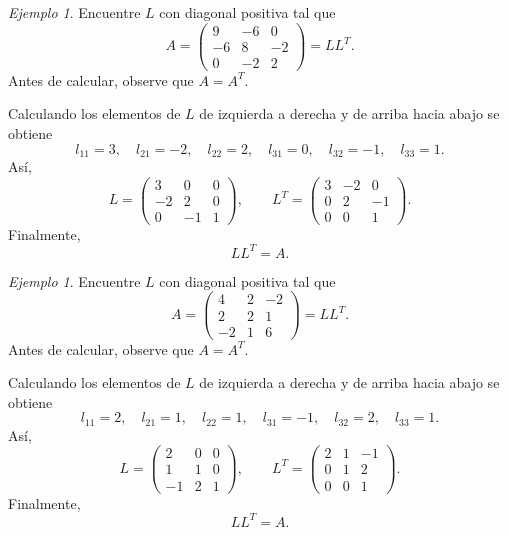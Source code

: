 \documentclass[12pt]{article}
\theoremstyle{remark}
\newtheorem{Ejem}[definicion]{Ejemplo}
\begin{document}
\begin{Ejem}

Encuentre $L$ con diagonal positiva tal que
\[
A=\begin{pmatrix}9 & -6 & 0\\-6 & 8 & -2\\0 & -2 & 2\end{pmatrix}=LL^T.
\]
Antes de calcular, observe que $A=A^T$.

Calculando los elementos de $L$ de izquierda a derecha y de arriba hacia abajo se obtiene
\[
l_{11}=3,\quad l_{21}=-2,\quad l_{22}=2,\quad l_{31}=0,\quad l_{32}=-1,\quad l_{33}=1.
\]
Así,
\[
L=\begin{pmatrix}3 & 0 & 0\\-2 & 2 & 0\\0 & -1 & 1\end{pmatrix},\qquad L^T=\begin{pmatrix}3 & -2 & 0\\0 & 2 & -1\\0 & 0 & 1\end{pmatrix}.
\]
Finalmente,
\[
\boxed{LL^T=A}.
\]
\end{Ejem}

\begin{Ejem}
Encuentre $L$ con diagonal positiva tal que
\[
A=\begin{pmatrix}4 & 2 & -2\\2 & 2 & 1\\-2 & 1 & 6\end{pmatrix}=LL^T.
\]
Antes de calcular, observe que $A=A^T$.


Calculando los elementos de $L$ de izquierda a derecha y de arriba hacia abajo se obtiene
\[
l_{11}=2,\quad l_{21}=1,\quad l_{22}=1,\quad l_{31}=-1,\quad l_{32}=2,\quad l_{33}=1.
\]
Así,
\[
L=\begin{pmatrix}2 & 0 & 0\\1 & 1 & 0\\-1 & 2 & 1\end{pmatrix},\qquad L^T=\begin{pmatrix}2 & 1 & -1\\0 & 1 & 2\\0 & 0 & 1\end{pmatrix}.
\]
Finalmente,
\[
\boxed{LL^T=A}.
\]

\end{Ejem}
\end{document}
